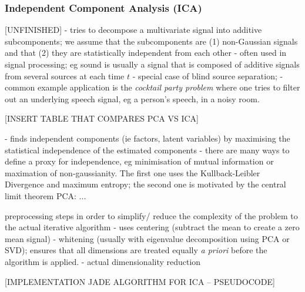 \hfill
\subsubsection{Independent Component Analysis (ICA)}
[UNFINISHED]
- tries to decompose a multivariate signal into additive subcomponents;
we assume that the subcomponents are (1) non-Gaussian signals and that (2) they are statistically independent from each other
- often used in signal processing; eg sound is usually a signal that is composed of additive signals from several sources at each time \( t \)
- special case of blind source separation;
- common example application is the \textit{cocktail party problem} where one tries to filter out an underlying speech signal, eg a person's speech, in a noisy room. 


[INSERT TABLE THAT COMPARES PCA VS ICA] 



- finds independent components (ie factors, latent variables) by maximising the statistical independence of the estimated components
- there are many ways to define a proxy for independence, eg minimisation of mutual information or maximation of non-gaussianity. The first one uses the Kullback-Leibler Divergence and maximum entropy; the second one is motivated by the central limit theorem %
PCA:
...

preprocessing steps in order to simplify/ reduce the complexity of the problem to the actual iterative algorithm
- uses centering (subtract the mean to create a zero mean signal)
- whitening (usually with eigenvalue decomposition using PCA or SVD); ensures that all dimensions are treated equally \textit{a priori} before the algorithm is applied. 
- actual dimensionality reduction 

[IMPLEMENTATION JADE ALGORITHM FOR ICA -- PSEUDOCODE]


